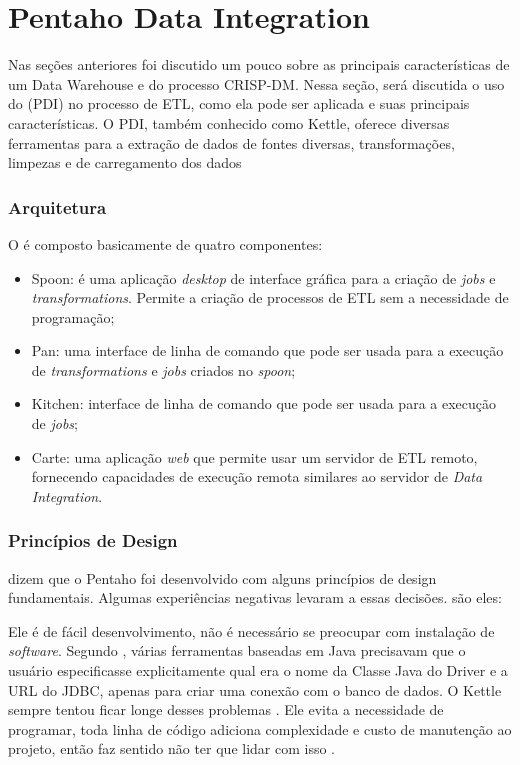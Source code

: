 \section{Pentaho Data Integration}
Nas seções anteriores foi discutido um pouco sobre as principais características de um Data Warehouse e do processo CRISP-DM. Nessa seção, será discutida o uso do \pdi (PDI) no processo de ETL, como ela pode ser aplicada e suas principais características.
O PDI, também conhecido como Kettle, oferece diversas ferramentas para a extração de dados de fontes diversas, transformações, limpezas e de carregamento dos dados
\subsubsection{Arquitetura}
O \pdi é composto basicamente de quatro componentes:
\begin{itemize}
    \item Spoon: é uma aplicação \textit{desktop} de interface gráfica para a criação de \textit{jobs} e \textit{transformations}. Permite a criação de processos de ETL sem a necessidade de programação;
    \item Pan: uma interface de linha de comando que pode ser usada para a execução de \textit{transformations} e \textit{jobs} criados no \textit{spoon};
    \item Kitchen: interface de linha de comando que pode ser usada para a execução de \textit{jobs};
    \item Carte: uma aplicação \textit{web} que permite usar um servidor de ETL remoto, fornecendo capacidades de execução remota similares ao servidor de \textit{Data Integration}.
\end{itemize}

\subsubsection{Princípios de Design}
 dizem que o Pentaho foi desenvolvido com alguns princípios de design fundamentais. Algumas experiências negativas levaram a essas decisões. são eles:

Ele é de fácil desenvolvimento, não é necessário se preocupar com instalação de \textit{software}. Segundo , várias ferramentas baseadas em Java precisavam que o usuário especificasse explicitamente qual era o nome da Classe Java do Driver e a URL do JDBC, apenas para criar uma conexão com o banco de dados. O Kettle sempre tentou ficar longe desses problemas \citep{kettle}. Ele evita a necessidade de programar, toda linha de código adiciona complexidade e custo de manutenção ao projeto, então faz sentido não ter que lidar com isso \citep{kettle}.

